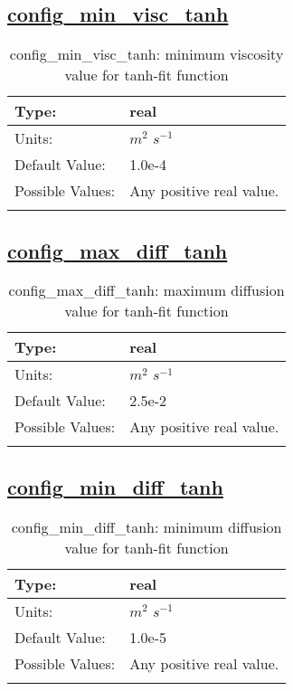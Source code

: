 \subsection[config\_min\_visc\_tanh]{\hyperref[sec:nm_tab_vmix_tanh]{config\_min\_visc\_tanh}}
\label{subsec:nm_sec_config_min_visc_tanh}
\begin{center}
\begin{longtable}{| p{2.0in} | p{4.0in} |}
    \hline
    Type: & real \\
    \hline
    Units: & $m^2$ $s^{-1}$ \\
    \hline
    Default Value: & 1.0e-4 \\
    \hline
    Possible Values: & Any positive real value. \\
    \hline
    \caption{config\_min\_visc\_tanh: minimum viscosity value for tanh-fit function}
\end{longtable}
\end{center}
\subsection[config\_max\_diff\_tanh]{\hyperref[sec:nm_tab_vmix_tanh]{config\_max\_diff\_tanh}}
\label{subsec:nm_sec_config_max_diff_tanh}
\begin{center}
\begin{longtable}{| p{2.0in} | p{4.0in} |}
    \hline
    Type: & real \\
    \hline
    Units: & $m^2$ $s^{-1}$ \\
    \hline
    Default Value: & 2.5e-2 \\
    \hline
    Possible Values: & Any positive real value. \\
    \hline
    \caption{config\_max\_diff\_tanh: maximum diffusion value for tanh-fit function}
\end{longtable}
\end{center}
\subsection[config\_min\_diff\_tanh]{\hyperref[sec:nm_tab_vmix_tanh]{config\_min\_diff\_tanh}}
\label{subsec:nm_sec_config_min_diff_tanh}
\begin{center}
\begin{longtable}{| p{2.0in} | p{4.0in} |}
    \hline
    Type: & real \\
    \hline
    Units: & $m^2$ $s^{-1}$ \\
    \hline
    Default Value: & 1.0e-5 \\
    \hline
    Possible Values: & Any positive real value. \\
    \hline
    \caption{config\_min\_diff\_tanh: minimum diffusion value for tanh-fit function}
\end{longtable}
\end{center}

